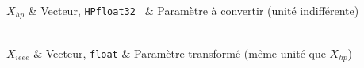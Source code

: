 \begin{tabarg}
\\
\hline
$X_{hp}$ & Vecteur, \texttt{HPfloat32 } & Param\`etre \`a convertir (unit\'e indiff\'erente)\\
\end{tabarg}

\medskip
\begin{tabarg}
\\
\hline
$X_{ieee}$ & Vecteur, \texttt{float} & Param\`etre transform\'e (m\^eme unit\'e
que $X_{hp}$)\\
\end{tabarg}
